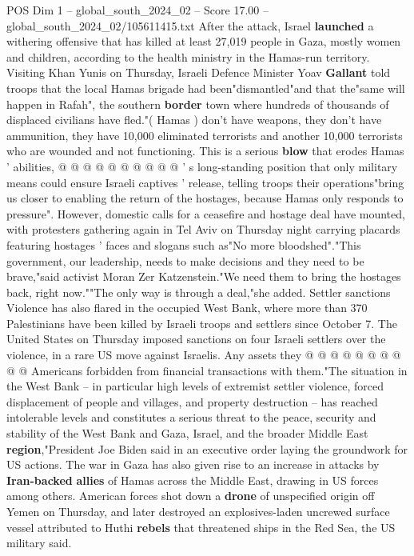 \begin{textsample}{POS Dim 1 – global\_south\_2024\_02 – Score 17.00 – global\_south\_2024\_02/105611415.txt}
After the attack, Israel \textbf{launched} a withering offensive that has killed at least 27,019 people in Gaza, mostly women and children, according to the health ministry in the Hamas-run territory.
Visiting Khan Yunis on Thursday, Israeli Defence Minister Yoav \textbf{Gallant} told troops that the local Hamas brigade had been"dismantled"and that the"same will happen in Rafah", the southern \textbf{border} town where hundreds of thousands of displaced civilians have fled."( Hamas ) don't have weapons, they don't have ammunition, they have 10,000 eliminated terrorists and another 10,000 terrorists who are wounded and not functioning.
This is a serious \textbf{blow} that erodes Hamas ' abilities, @ @ @ @ @ @ @ @ @ @ ' s long-standing position that only military means could ensure Israeli captives ' release, telling troops their operations"bring us closer to enabling the return of the hostages, because Hamas only responds to pressure".
However, domestic calls for a ceasefire and hostage deal have mounted, with protesters gathering again in Tel Aviv on Thursday night carrying placards featuring hostages ' faces and slogans such as"No more bloodshed"."This government, our leadership, needs to make decisions and they need to be brave,"said activist Moran Zer Katzenstein."We need them to bring the hostages back, right now.""The only way is through a deal,"she added.
Settler sanctions Violence has also flared in the occupied West Bank, where more than 370 Palestinians have been killed by Israeli troops and settlers since October 7.
The United States on Thursday imposed sanctions on four Israeli settlers over the violence, in a rare US move against Israelis.
Any assets they @ @ @ @ @ @ @ @ @ @ Americans forbidden from financial transactions with them."The situation in the West Bank -- in particular high levels of extremist settler violence, forced displacement of people and villages, and property destruction -- has reached intolerable levels and constitutes a serious threat to the peace, security and stability of the West Bank and Gaza, Israel, and the broader Middle East \textbf{region},"President Joe Biden said in an executive order laying the groundwork for US actions.
The war in Gaza has also given rise to an increase in attacks by \textbf{Iran-backed} \textbf{allies} of Hamas across the Middle East, drawing in US forces among others.
American forces shot down a \textbf{drone} of unspecified origin off Yemen on Thursday, and later destroyed an explosives-laden uncrewed surface vessel attributed to Huthi \textbf{rebels} that threatened ships in the Red Sea, the US military said.

\end{textsample}
